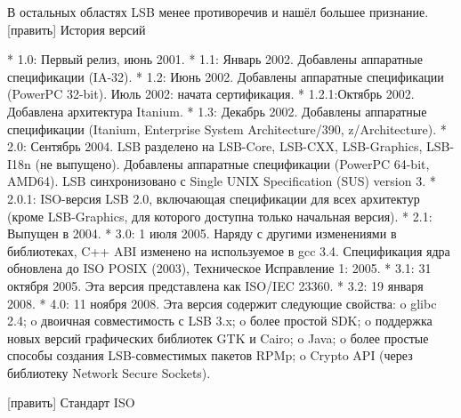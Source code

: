 В остальных областях LSB менее противоречив и нашёл большее признание.
[править] История версий

    * 1.0: Первый релиз, июнь 2001.
    * 1.1: Январь 2002. Добавлены аппаратные спецификации (IA-32).
    * 1.2: Июнь 2002. Добавлены аппаратные спецификации (PowerPC 32-bit). Июль 2002: начата сертификация.
    * 1.2.1:Октябрь 2002. Добавлена архитектура Itanium.
    * 1.3: Декабрь 2002. Добавлены аппаратные спецификации (Itanium, Enterprise System Architecture/390, z/Architecture).
    * 2.0: Сентябрь 2004. LSB разделено на LSB-Core, LSB-CXX, LSB-Graphics, LSB-I18n (не выпущено). Добавлены аппаратные спецификации (PowerPC 64-bit, AMD64). LSB синхронизовано с Single UNIX Specification (SUS) version 3.
    * 2.0.1: ISO-версия LSB 2.0, включающая спецификации для всех архитектур (кроме LSB-Graphics, для которого доступна только начальная версия).
    * 2.1: Выпущен в 2004.
    * 3.0: 1 июля 2005. Наряду с другими изменениями в библиотеках, C++ ABI изменено на используемое в gcc 3.4. Спецификация ядра обновлена до ISO POSIX (2003), Техническое Исправление 1: 2005.
    * 3.1: 31 октября 2005. Эта версия представлена как ISO/IEC 23360.
    * 3.2: 19 января 2008.
    * 4.0: 11 ноября 2008. Эта версия содержит следующие свойства:
          o glibc 2.4;
          o двоичная совместимость с LSB 3.x;
          o более простой SDK;
          o поддержка новых версий графических библиотек GTK и Cairo;
          o Java;
          o более простые способы создания LSB-совместимых пакетов RPMp;
          o Crypto API (через библиотеку Network Secure Sockets).

[править] Стандарт ISO

